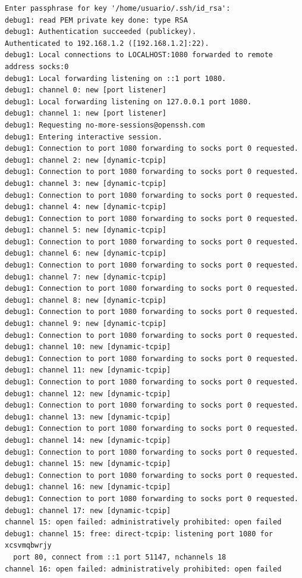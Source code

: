 \documentclass[11pt]{article}
\begin{document}
\begin{lstlisting}
Enter passphrase for key '/home/usuario/.ssh/id_rsa':
debug1: read PEM private key done: type RSA
debug1: Authentication succeeded (publickey).
Authenticated to 192.168.1.2 ([192.168.1.2]:22).
debug1: Local connections to LOCALHOST:1080 forwarded to remote address socks:0
debug1: Local forwarding listening on ::1 port 1080.
debug1: channel 0: new [port listener]
debug1: Local forwarding listening on 127.0.0.1 port 1080.
debug1: channel 1: new [port listener]
debug1: Requesting no-more-sessions@openssh.com
debug1: Entering interactive session.
debug1: Connection to port 1080 forwarding to socks port 0 requested.
debug1: channel 2: new [dynamic-tcpip]
debug1: Connection to port 1080 forwarding to socks port 0 requested.
debug1: channel 3: new [dynamic-tcpip]
debug1: Connection to port 1080 forwarding to socks port 0 requested.
debug1: channel 4: new [dynamic-tcpip]
debug1: Connection to port 1080 forwarding to socks port 0 requested.
debug1: channel 5: new [dynamic-tcpip]
debug1: Connection to port 1080 forwarding to socks port 0 requested.
debug1: channel 6: new [dynamic-tcpip]
debug1: Connection to port 1080 forwarding to socks port 0 requested.
debug1: channel 7: new [dynamic-tcpip]
debug1: Connection to port 1080 forwarding to socks port 0 requested.
debug1: channel 8: new [dynamic-tcpip]
debug1: Connection to port 1080 forwarding to socks port 0 requested.
debug1: channel 9: new [dynamic-tcpip]
debug1: Connection to port 1080 forwarding to socks port 0 requested.
debug1: channel 10: new [dynamic-tcpip]
debug1: Connection to port 1080 forwarding to socks port 0 requested.
debug1: channel 11: new [dynamic-tcpip]
debug1: Connection to port 1080 forwarding to socks port 0 requested.
debug1: channel 12: new [dynamic-tcpip]
debug1: Connection to port 1080 forwarding to socks port 0 requested.
debug1: channel 13: new [dynamic-tcpip]
debug1: Connection to port 1080 forwarding to socks port 0 requested.
debug1: channel 14: new [dynamic-tcpip]
debug1: Connection to port 1080 forwarding to socks port 0 requested.
debug1: channel 15: new [dynamic-tcpip]
debug1: Connection to port 1080 forwarding to socks port 0 requested.
debug1: channel 16: new [dynamic-tcpip]
debug1: Connection to port 1080 forwarding to socks port 0 requested.
debug1: channel 17: new [dynamic-tcpip]
channel 15: open failed: administratively prohibited: open failed
debug1: channel 15: free: direct-tcpip: listening port 1080 for xcsvmqbwrjy
  port 80, connect from ::1 port 51147, nchannels 18
channel 16: open failed: administratively prohibited: open failed

\end{lstlisting}
\end{document}
